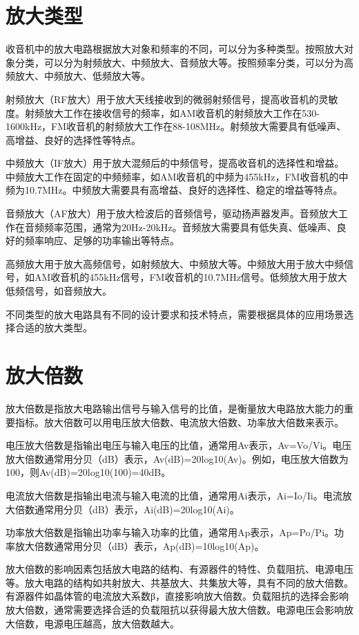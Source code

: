 \documentclass[12pt,UTF8]{ctexbook}
\begin{document}
\section{放大类型}

收音机中的放大电路根据放大对象和频率的不同，可以分为多种类型。按照放大对象分类，可以分为射频放大、中频放大、音频放大等。按照频率分类，可以分为高频放大、中频放大、低频放大等。

射频放大（RF放大）用于放大天线接收到的微弱射频信号，提高收音机的灵敏度。射频放大工作在接收信号的频率，如AM收音机的射频放大工作在530-1600kHz，FM收音机的射频放大工作在88-108MHz。射频放大需要具有低噪声、高增益、良好的选择性等特点。

中频放大（IF放大）用于放大混频后的中频信号，提高收音机的选择性和增益。中频放大工作在固定的中频频率，如AM收音机的中频为455kHz，FM收音机的中频为10.7MHz。中频放大需要具有高增益、良好的选择性、稳定的增益等特点。

音频放大（AF放大）用于放大检波后的音频信号，驱动扬声器发声。音频放大工作在音频频率范围，通常为20Hz-20kHz。音频放大需要具有低失真、低噪声、良好的频率响应、足够的功率输出等特点。

高频放大用于放大高频信号，如射频放大、中频放大等。中频放大用于放大中频信号，如AM收音机的455kHz信号，FM收音机的10.7MHz信号。低频放大用于放大低频信号，如音频放大。

不同类型的放大电路具有不同的设计要求和技术特点，需要根据具体的应用场景选择合适的放大类型。

\section{放大倍数}

放大倍数是指放大电路输出信号与输入信号的比值，是衡量放大电路放大能力的重要指标。放大倍数可以用电压放大倍数、电流放大倍数、功率放大倍数来表示。

电压放大倍数是指输出电压与输入电压的比值，通常用Av表示，Av=Vo/Vi。电压放大倍数通常用分贝（dB）表示，Av(dB)=20log10(Av)。例如，电压放大倍数为100，则Av(dB)=20log10(100)=40dB。

电流放大倍数是指输出电流与输入电流的比值，通常用Ai表示，Ai=Io/Ii。电流放大倍数通常用分贝（dB）表示，Ai(dB)=20log10(Ai)。

功率放大倍数是指输出功率与输入功率的比值，通常用Ap表示，Ap=Po/Pi。功率放大倍数通常用分贝（dB）表示，Ap(dB)=10log10(Ap)。

放大倍数的影响因素包括放大电路的结构、有源器件的特性、负载阻抗、电源电压等。放大电路的结构如共射放大、共基放大、共集放大等，具有不同的放大倍数。有源器件如晶体管的电流放大系数β，直接影响放大倍数。负载阻抗的选择会影响放大倍数，通常需要选择合适的负载阻抗以获得最大放大倍数。电源电压会影响放大倍数，电源电压越高，放大倍数越大。
\end{document}

